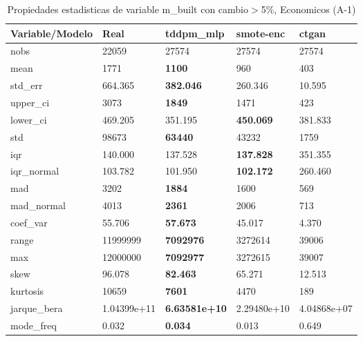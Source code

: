 \begin{table}[H]
\centering
\fontsize{8}{14}\selectfont
\caption{Propiedades estadisticas de variable m\_built con cambio\ensuremath{>}5\%, Economicos (A-1)}
\label{table-stats-economicos-a-1-m_built-short}
\begin{tabular}{|l|m{10em}|m{10em}|m{10em}|m{10em}|}
\hline
 \rowcolor[gray]{0.8}
Variable/Modelo & Real & tddpm\_mlp & smote-enc & ctgan \\
\hline nobs & 22059 & 27574 & 27574 & 27574 \\
\hline mean & 1771 & \bfseries 1100 & 960 & \cellcolor[rgb]{0.9, 0.54, 0.52} 403 \\
\hline std\_err & 664.365 & \bfseries 382.046 & 260.346 & \cellcolor[rgb]{0.9, 0.54, 0.52} 10.595 \\
\hline upper\_ci & 3073 & \bfseries 1849 & 1471 & \cellcolor[rgb]{0.9, 0.54, 0.52} 423 \\
\hline lower\_ci & 469.205 & \cellcolor[rgb]{0.9, 0.54, 0.52} 351.195 & \bfseries 450.069 & 381.833 \\
\hline std & 98673 & \bfseries 63440 & 43232 & \cellcolor[rgb]{0.9, 0.54, 0.52} 1759 \\
\hline iqr & 140.000 & 137.528 & \bfseries 137.828 & \cellcolor[rgb]{0.9, 0.54, 0.52} 351.355 \\
\hline iqr\_normal & 103.782 & 101.950 & \bfseries 102.172 & \cellcolor[rgb]{0.9, 0.54, 0.52} 260.460 \\
\hline mad & 3202 & \bfseries 1884 & 1600 & \cellcolor[rgb]{0.9, 0.54, 0.52} 569 \\
\hline mad\_normal & 4013 & \bfseries 2361 & 2006 & \cellcolor[rgb]{0.9, 0.54, 0.52} 713 \\
\hline coef\_var & 55.706 & \bfseries 57.673 & 45.017 & \cellcolor[rgb]{0.9, 0.54, 0.52} 4.370 \\
\hline range & 11999999 & \bfseries 7092976 & 3272614 & \cellcolor[rgb]{0.9, 0.54, 0.52} 39006 \\
\hline max & 12000000 & \bfseries 7092977 & 3272615 & \cellcolor[rgb]{0.9, 0.54, 0.52} 39007 \\
\hline skew & 96.078 & \bfseries 82.463 & 65.271 & \cellcolor[rgb]{0.9, 0.54, 0.52} 12.513 \\
\hline kurtosis & 10659 & \bfseries 7601 & 4470 & \cellcolor[rgb]{0.9, 0.54, 0.52} 189 \\
\hline jarque\_bera & 1.04399e+11 & \bfseries 6.63581e+10 & 2.29480e+10 & \cellcolor[rgb]{0.9, 0.54, 0.52} 4.04868e+07 \\
\hline mode\_freq & 0.032 & \bfseries 0.034 & 0.013 & \cellcolor[rgb]{0.9, 0.54, 0.52} 0.649 \\

\end{tabular}
\end{table}
